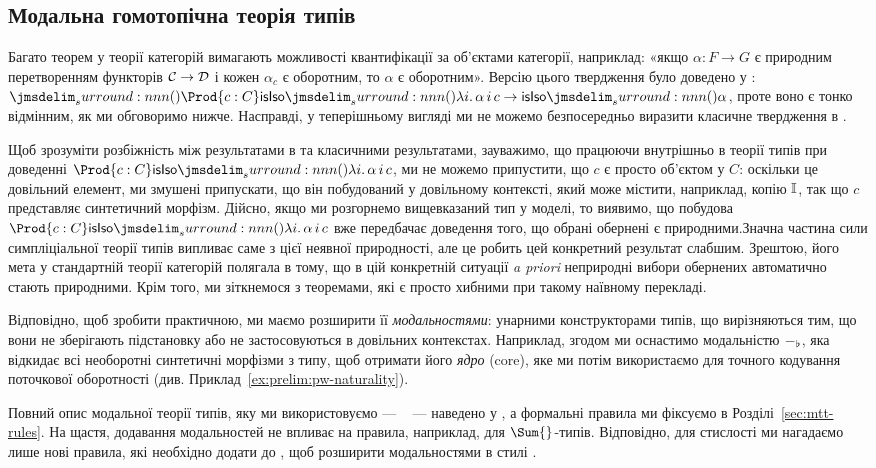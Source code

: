 \documentclass[12pt]{article}
\newcommand{\textcite}{\cite}
\newcommand{\parencite}{\cite}
\newcommand{\GM}{\flat}
\let\prn\DelimPrn
\begin{document}
\subsection{Модальна гомотопічна теорія типів}
Багато теорем у теорії категорій вимагають можливості квантифікації за об'єктами категорії, наприклад: «якщо $\alpha : F \to G$ є природним перетворенням функторів $\mathcal{C} \to \mathcal{D}$ і кожен $\alpha_c$ є оборотним, то $\alpha$ є оборотним». Версію цього твердження було доведено у \textcite{riehl:2017}: $\prn{\Prod{c : C} \IsIso\prn{\lambda i.\,\alpha\,i\,c}} \to \IsIso\prn{\alpha}$, проте воно є тонко відмінним, як ми обговоримо нижче. Насправді, у теперішньому вигляді ми не можемо безпосередньо виразити класичне твердження в \STT{}.

Щоб зрозуміти розбіжність між результатами в \STT{} та класичними результатами, зауважимо, що працюючи внутрішньо в теорії типів при доведенні $\Prod{c : C} \IsIso\prn{\lambda i.\,\alpha\,i\,c}$, ми не можемо припустити, що $c$ є просто об'єктом у $C$: оскільки це довільний елемент, ми змушені припускати, що він побудований у довільному контексті, який може містити, наприклад, копію $\mathbb{I}$, так що $c$ представляє синтетичний морфізм. Дійсно, якщо ми розгорнемо вищевказаний тип у моделі, то виявимо, що побудова $\Prod{c : C} \IsIso\prn{\lambda i.\,\alpha\,i\,c}$ вже передбачає доведення того, що обрані обернені є природними.Значна частина сили симпліціальної теорії типів випливає саме з цієї неявної природності, але це робить цей конкретний результат слабшим. Зрештою, його мета у стандартній теорії категорій полягала в тому, що в цій конкретній ситуації \emph{a priori} неприродні вибори обернених автоматично стають природними. Крім того, ми зіткнемося з теоремами, які є просто хибними при такому наївному перекладі.

Відповідно, щоб зробити \STT{} практичною, ми маємо розширити її \emph{модальностями}: унарними конструкторами типів, що вирізняються тим, що вони не зберігають підстановку або не застосовуються в довільних контекстах. Наприклад, згодом ми оснастимо \STT{} модальністю $\Modify[\GM]{-}$, яка відкидає всі необоротні синтетичні морфізми з типу, щоб отримати його \emph{ядро} (core), яке ми потім використаємо для точного кодування поточкової оборотності (див. Приклад~\ref{ex:prelim:pw-naturality}).

Повний опис модальної теорії типів, яку ми використовуємо --- \MTT{}~\parencite{gratzer:2020} --- наведено у \textcite{gratzer:phd}, а формальні правила ми фіксуємо в Розділі~\ref{sec:mtt-rules}. На щастя, додавання модальностей не впливає на правила, наприклад, для $\Sum{}$-типів. Відповідно, для стислості ми нагадаємо лише нові правила, які необхідно додати до \MLTT{}, щоб розширити \HoTT{} модальностями в стилі \MTT{}.
\end{document}
